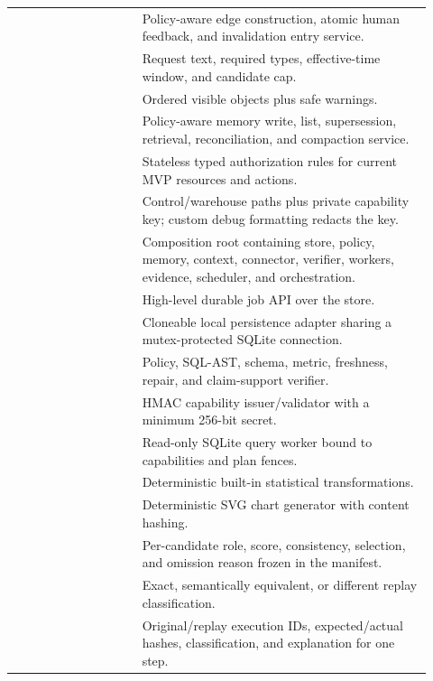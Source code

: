 \begin{longtable}{L{0.29\linewidth}L{0.63\linewidth}}
 & Policy-aware edge construction, atomic human feedback, and invalidation entry service. \\
 & Request text, required types, effective-time window, and candidate cap. \\
 & Ordered visible objects plus safe warnings. \\
 & Policy-aware memory write, list, supersession, retrieval, reconciliation, and compaction service. \\
 & Stateless typed authorization rules for current MVP resources and actions. \\
 & Control/warehouse paths plus private capability key; custom debug formatting redacts the key. \\
 & Composition root containing store, policy, memory, context, connector, verifier, workers, evidence, scheduler, and orchestration. \\
 & High-level durable job API over the store. \\
 & Cloneable local persistence adapter sharing a mutex-protected SQLite connection. \\
 & Policy, SQL-AST, schema, metric, freshness, repair, and claim-support verifier. \\
 & HMAC capability issuer/validator with a minimum 256-bit secret. \\
 & Read-only SQLite query worker bound to capabilities and plan fences. \\
 & Deterministic built-in statistical transformations. \\
 & Deterministic SVG chart generator with content hashing. \\
 & Per-candidate role, score, consistency, selection, and omission reason frozen in the manifest. \\
 & Exact, semantically equivalent, or different replay classification. \\
\newline{} & Original/replay execution IDs, expected/actual hashes, classification, and explanation for one step. \\

\end{longtable}
